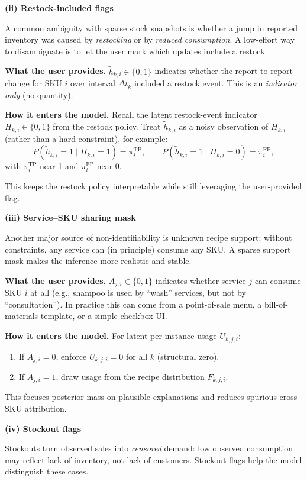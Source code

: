 \documentclass[11pt]{article}
\begin{document}
\textbf{(ii) Restock-included flags}

A common ambiguity with sparse stock snapshots is whether a jump in reported inventory was caused by \emph{restocking} or by \emph{reduced consumption}.
A low-effort way to disambiguate is to let the user mark which updates include a restock.

\textbf{What the user provides.} $\tilde{h}_{k,i}\in\{0,1\}$ indicates whether the report-to-report change for SKU $i$ over interval $\Delta t_k$ included a restock event.
This is an \emph{indicator only} (no quantity).

\textbf{How it enters the model.} Recall the latent restock-event indicator $H_{k,i}\in\{0,1\}$ from the restock policy.
Treat $\tilde{h}_{k,i}$ as a noisy observation of $H_{k,i}$ (rather than a hard constraint), for example:
\[
  P(\tilde{h}_{k,i}=1\mid H_{k,i}=1)=\pi^{\mathrm{TP}}_i,\qquad
  P(\tilde{h}_{k,i}=1\mid H_{k,i}=0)=\pi^{\mathrm{FP}}_i,
\]
with $\pi^{\mathrm{TP}}_i$ near 1 and $\pi^{\mathrm{FP}}_i$ near 0.

This keeps the restock policy interpretable while still leveraging the user-provided flag.

\textbf{(iii) Service--SKU sharing mask}

Another major source of non-identifiability is unknown recipe support: without constraints, any service can (in principle) consume any SKU.
A sparse support mask makes the inference more realistic and stable.

\textbf{What the user provides.} $A_{j,i}\in\{0,1\}$ indicates whether service $j$ can consume SKU $i$ at all (e.g., shampoo is used by ``wash'' services, but not by ``consultation'').
In practice this can come from a point-of-sale menu, a bill-of-materials template, or a simple checkbox UI.

\textbf{How it enters the model.} For latent per-instance usage $U_{k,j,i}$:
\begin{enumerate}
  \item If $A_{j,i}=0$, enforce $U_{k,j,i}=0$ for all $k$ (structural zero).
  \item If $A_{j,i}=1$, draw usage from the recipe distribution $F_{k,j,i}$.
\end{enumerate}

This focuses posterior mass on plausible explanations and reduces spurious cross-SKU attribution.

\textbf{(iv) Stockout flags}

Stockouts turn observed sales into \emph{censored} demand: low observed consumption may reflect lack of inventory, not lack of customers.
Stockout flags help the model distinguish these cases.
\end{document}
